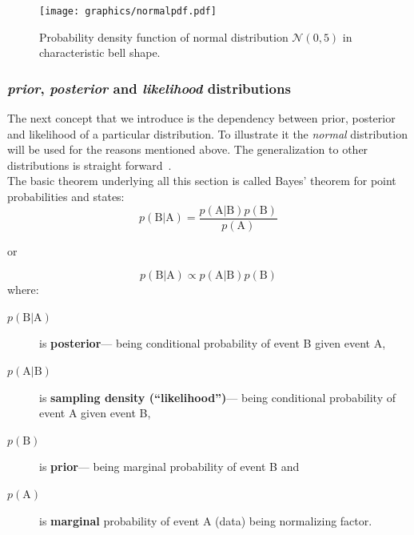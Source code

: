 \documentclass[12pt, a4paper, pdflatex, leqno]{report}
\begin{document}
\begin{figure}[htbp]
\centering
\texttt{[image: graphics/normalpdf.pdf]}
\begin{tiny}
\caption{Probability density function of normal distribution $\mathcal{N}\left( 0, 5 \right)$ in characteristic bell shape.\label{fig:normaldist}}
\end{tiny}
\vspace{1cm}
\end{figure}



\subsubsection{\emph{prior}, \emph{posterior} and \emph{likelihood} distributions}
The next concept that we introduce is the dependency between prior, posterior and likelihood of a particular distribution. To illustrate it the \emph{normal} distribution will be used for the reasons mentioned above. The generalization to other distributions is straight forward~\citep{gelman2003bayesian}.\\

The basic theorem underlying all this section is called Bayes' theorem for point probabilities and states:
$$
p \left( \mathrm{B} | \mathrm{A} \right) = \frac{  p \left( \mathrm{A} | \mathrm{B} \right) p \left( \mathrm{B} \right) }{ p \left( \mathrm{A} \right) }
$$
\begin{center}
or
\end{center}
$$
p \left( \mathrm{B} | \mathrm{A} \right) \propto p \left( \mathrm{A} | \mathrm{B} \right) p \left( \mathrm{B} \right)
$$
where:
\begin{description}
\item[$p \left( \mathrm{B} | \mathrm{A} \right)$] is \textbf{posterior}--- being conditional probability of event \textrm{B} given event \textrm{A},
\item[$p \left( \mathrm{A} | \mathrm{B} \right)$] is \textbf{sampling density (``likelihood'')}--- being conditional probability of event \textrm{A} given event \textrm{B},
\item[$p \left( \mathrm{B} \right)$] is \textbf{prior}--- being marginal probability of event \textrm{B} and
\item[$p \left( \mathrm{A} \right)$] is \textbf{marginal} probability of event \textrm{A} (data) being normalizing factor.
\end{description}
\end{document}

